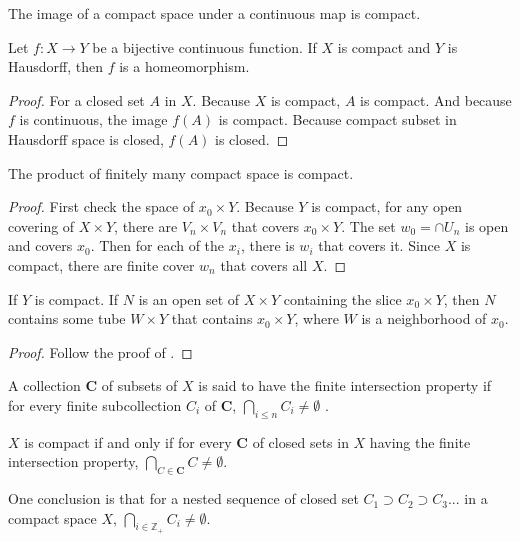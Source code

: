 \begin{theorem}
    The image of a compact space under a continuous map is compact.    
\end{theorem}

\begin{theorem}
    Let $f: X \rightarrow Y$ be a bijective continuous function. If $X$ is compact and $Y$ is Hausdorff, then $f$ is a homeomorphism.
\end{theorem}
\begin{proof}
    For a closed set $A$ in $X$. Because $X$ is compact, $A$ is compact. And because $f$ is continuous, the image $f(A)$ is compact. Because compact subset in Hausdorff space is closed, $f(A)$ is closed.
\end{proof}

\begin{theorem}\label{finite_product_of_compact_space}
    The product of finitely many compact space is compact.
\end{theorem}
\begin{proof}
    First check the space of $x_0 \times Y$. Because $Y$ is compact, for any open covering of $X \times Y$, there are $V_n \times V_n$ that covers $x_0 \times Y$. The set $w_0 = \cap U_n$ is open and covers $x_0$. Then for each of the $x_i$, there is $w_i$ that covers it. Since $X$ is compact, there are finite cover $w_n$ that covers all $X$.
\end{proof}

\begin{theorem}
    If $Y$ is compact. If $N$ is an open set of $X \times Y$ containing the slice $x_0 \times Y$, then $N$ contains some tube $W \times Y$ that contains $x_0 \times Y$, where $W$ is a neighborhood of $x_0$.
\end{theorem}
\begin{proof}
    Follow the proof of .
\end{proof}

\begin{definition}
    A collection $\mathbf{C}$ of subsets of $X$ is said to have the finite intersection property if for every finite subcollection $C_i$ of $\mathbf{C}$, $\bigcap_{i \leq n} C_i \neq \emptyset$ .
\end{definition}

\begin{theorem}
    $X$ is compact if and only if for every $\mathbf{C}$ of closed sets in $X$ having the finite intersection property, $\bigcap_{C \in \mathbf{C}} C \neq \emptyset$.
    
    One conclusion is that for a nested sequence of closed set $C_1 \supset C_2 \supset C_3 ...$ in a compact space $X$, $\bigcap_{i \in \mathbb{Z}_{+}} C_i \neq \emptyset$.
\end{theorem}


